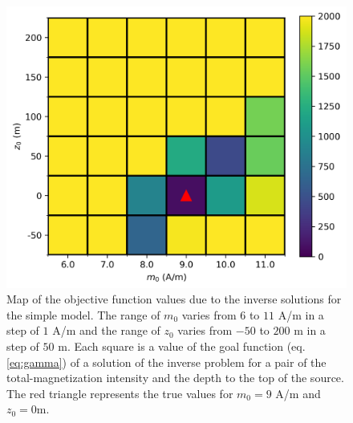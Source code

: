 \begin{figure}
	\centering
	\includegraphics[scale=.75]{figures/wedding_cake_obj_func_map.png}
	\caption{Map of the objective function values due to the inverse solutions for the simple model. The range of $m_0$ varies from $6$ to $11$ A/m in a step of $1$ A/m and the range of $z_0$ varies from $-50$ to $200$ m in a step of $50$ m. Each square is a value of the goal function (eq. \ref{eq:gamma}) of a solution of the inverse problem for a pair of the total-magnetization intensity and the depth to the top of the source. The red triangle represents the true values for $m_0 = 9$ A/m and $z_0=0$m.
	}
	\label{fig:kimb_map}
\end{figure}

